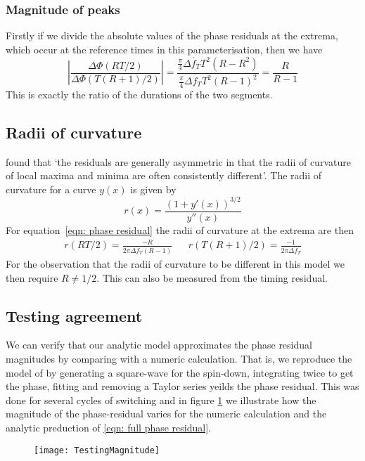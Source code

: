 \documentclass[/home/greg/Thesis/main/main.tex]{subfiles}
\begin{document}
\subsubsection{Magnitude of peaks}
Firstly if we divide the absolute values of the phase residuals at the extrema, which occur at the reference
times in this parameterisation, then we have
\begin{equation}
    \left|\frac{\Delta\Phi\left(RT/2\right)}{\Delta\Phi\left(T(R+1)/2\right)}\right|
    = \frac{\frac{\pi}{4}\Delta\dot{f_{T}} T^{2}(R-R^{2})}{\frac{\pi}{4}\Delta\dot{f_{T}} T^{2}(R-1)^{2}}
= \frac{R}{R-1}
\end{equation}
This is exactly the ratio of the durations of the two segments.  


\subsection{Radii of curvature}
\citet{Hobbs2010} found that `the residuals are generally asymmetric in that the radii 
of curvature of local maxima and minima are often consistently different'. The radii of curvature
for a curve $y(x)$ is given by 
\begin{equation}
    r(x) = \frac{\left(1 + y'(x)\right)^{3/2}}{y''(x)}
\end{equation}
For equation~\eqref{eqn: phase residual}  the radii of curvature at the extrema are then
\begin{align}
    r\left(RT/2\right) = \frac{-R}{2\pi\Delta{\dot{f}_{T}}(R-1)} && 
    r\left(T(R+1)/2\right) =  \frac{-1}{2\pi\Delta{\dot{f}_{T}}} 
\end{align}
For the observation that the radii of curvature to be different in this model we then require $R\ne 1/2$. 
This can also be measured from the timing residual.

\subsection{Testing agreement}
We can verify that our analytic model approximates the phase residual magnitudes
by comparing with a numeric calculation. That is, we reproduce the model of
\citet{Lyne2010} by generating a square-wave for the spin-down, integrating
twice to get the phase, fitting and removing a Taylor series yeilds the 
phase residual. This was done for several cycles of switching and in figure
\ref{fig: compare analytic numeric two state} we illustrate how the magnitude
of the phase-residual varies for the numeric calculation and the analytic
preduction of \eqref{eqn: full phase residual}. 

\begin{figure}
    \centering
    \texttt{[image: TestingMagnitude]}
    \caption{}
    \label{fig: compare analytic numeric two state}
\end{figure}
\end{document}
